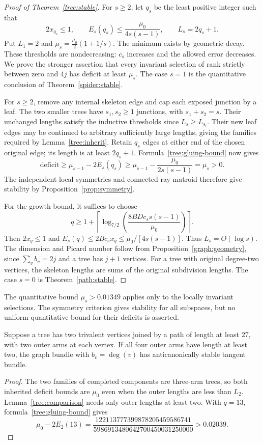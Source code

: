 \begin{proof}[Proof of Theorem~\ref{tree:stable}]
For $s\ge2$, let $q_s$ be the least positive integer such that
\begin{equation}\label{tree:threshold}
 2x_{q_s}\le1,\qquad
 E_s(q_s)\le\frac{\mu_0}{4s(s-1)},
 \qquad L_s=2q_s+1.
\end{equation}
Put $L_1=2$ and $\mu_s=\frac{\mu_0}{2}(1+1/s)$.
The minimum exists by geometric decay. These thresholds are
nondecreasing: $c_s$ increases and the allowed error decreases.
We prove the stronger assertion that every invariant selection of
rank strictly between zero and $4j$ has deficit at least $\mu_s$.
The case $s=1$ is the quantitative conclusion of
Theorem~\ref{spider:stable}.

For $s\ge2$, remove any internal skeleton edge and cap each exposed
junction by a leaf. The two smaller trees have $s_1,s_2\ge1$
junctions, with $s_1+s_2=s$. Their unchanged lengths satisfy the
inductive thresholds since $L_s\ge L_{s_i}$. Their new leaf edges
may be continued to arbitrary sufficiently large lengths, giving the
families required by Lemma~\ref{tree:inherit}. Retain $q_s$ edges
at either end of the chosen original edge; its length is at
least $2q_s+1$. Formula~\eqref{tree:gluing-bound} now gives
\[
 \text{deficit}\ge\mu_{s-1}-2E_s(q_s)
 \ge\mu_{s-1}-\frac{\mu_0}{2s(s-1)}=\mu_s>0.
\]
The independent local symmetries and connected ray matroid therefore
give stability by Proposition~\ref{prop:symmetry}.

For the growth bound, it suffices to choose
\[
 q\ge1+\left\lceil
  \log_{7/2}\!\left(\frac{8BDc_s s(s-1)}{\mu_0}\right)
 \right\rceil.
\]
Then $2x_q\le1$ and
$E_s(q)\le2Bc_sx_q\le\mu_0/[4s(s-1)]$. Thus $L_s=O(\log s)$.
The dimension and Picard number follow from
Proposition~\ref{graph:geometry}, since $\sum_v b_v=2j$ and a tree
has $j+1$ vertices. For a tree with original degree-two vertices,
the skeleton lengths are sums of the original subdivision lengths.
The case $s=0$ is Theorem~\ref{path:stable}.
\end{proof}

The quantitative bound $\mu_s>0.01349$ applies only to the locally
invariant selections. The symmetry criterion gives stability for all
subspaces, but no uniform quantitative bound for their deficits is asserted.

\begin{corollary}\label{tree:two-junctions}
Suppose a tree has two trivalent vertices joined by a path of length
at least $27$, with two outer arms at each vertex. If all four outer
arms have length at least two, the graph bundle with $b_v=\deg(v)$ has
anticanonically stable tangent bundle.
\end{corollary}

\begin{proof}
The two families of completed components are three-arm trees, so both
inherited deficit bounds are $\mu_0$ even when the outer lengths are less
than $L_2$. Lemma~\ref{tree:comparison} needs only outer lengths
at least two. With $q=13$, formula~\eqref{tree:gluing-bound} gives
\[
 \mu_0-2E_2(13)=
 \frac{122113777399878205459586741}
      {5986913480642700450031250000}>0.02039.
\]
\end{proof}
